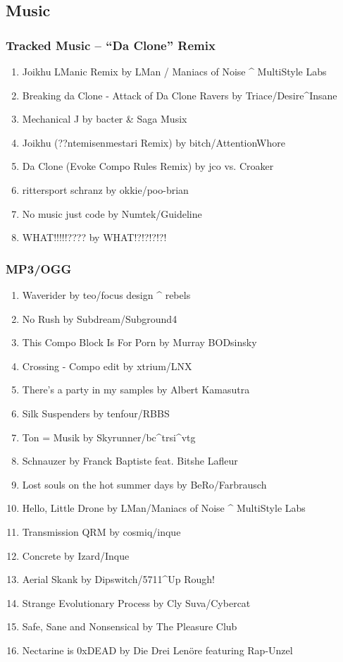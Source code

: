 \documentclass{beamer}
\begin{document}
\subsection{Music}
\begin{frame}
  \frametitle{Tracked Music --  ``Da Clone'' Remix}
  \begin{enumerate}
  \item Joikhu LManic Remix by LMan / Maniacs of Noise \^{} MultiStyle Labs
  \item Breaking da Clone - Attack of Da Clone Ravers by Triace/Desire\^{}Insane
  \item Mechanical J by bacter \& Saga Musix
  \item Joikhu (??ntemisenmestari Remix) by bitch/AttentionWhore
  \item Da Clone (Evoke Compo Rules Remix) by jco vs. Croaker
  \item rittersport schranz by okkie/poo-brian
  \item No music just code by Numtek/Guideline
  \item WHAT!!!!!???? by WHAT!?!?!?!?!
  \end{enumerate}
\end{frame}


\begin{frame}
  \frametitle{MP3/OGG}
  {\tiny\begin{enumerate}
  \item Waverider by teo/focus design \^{} rebels
  \item No Rush by Subdream/Subground4
  \item This Compo Block Is For Porn by Murray BODsinsky
  \item Crossing - Compo edit by xtrium/LNX
  \item There's a party in my samples by Albert Kamasutra
  \item Silk Suspenders by tenfour/RBBS
  \item Ton = Musik by Skyrunner/bc\^{}trsi\^{}vtg
  \item Schnauzer by Franck Baptiste feat. Bitshe Lafleur
  \item Lost souls on the hot summer days by BeRo/Farbrausch
  \item Hello, Little Drone by LMan/Maniacs of Noise \^{} MultiStyle Labs
  \item Transmission QRM by cosmiq/inque
  \item Concrete by Izard/Inque
  \item Aerial Skank by Dipswitch/5711\^{}Up Rough!
  \item Strange Evolutionary Process by Cly Suva/Cybercat
  \item Safe, Sane and Nonsensical by The Pleasure Club
  \item Nectarine is 0xDEAD by Die Drei Lenöre featuring Rap-Unzel
  \end{enumerate}}
\end{frame}
\end{document}
